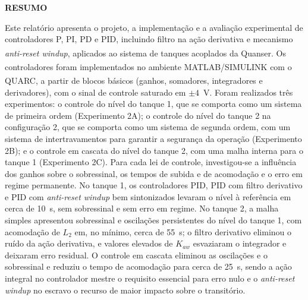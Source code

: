 \documentclass[a4paper,12pt]{article}
\begin{document}
\newpage


\thispagestyle{empty}

\begin{center}
{\large \textbf{RESUMO}}
\end{center}

\vspace{3cm}

\vspace{\baselineskip}

\begin{justify}
    \hspace{4ex}Este relatório apresenta o projeto, a implementação e a avaliação experimental de controladores P, PI, PD e PID, incluindo filtro na ação derivativa e mecanismo \textit{anti-reset windup}, aplicados ao sistema de tanques acoplados da Quanser\textsuperscript{\textregistered}. Os controladores foram implementados no ambiente MATLAB\textsuperscript{\textregistered}/SIMULINK\textsuperscript{\textregistered} com o QUARC\textsuperscript{\textregistered}, a partir de blocos básicos (ganhos, somadores, integradores e derivadores), com o sinal de controle saturado em $\pm 4$~V. Foram realizados três experimentos: o controle do nível do tanque 1, que se comporta como um sistema de primeira ordem (Experimento 2A); o controle do nível do tanque 2 na configuração 2, que se comporta como um sistema de segunda ordem, com um sistema de intertravamentos para garantir a segurança da operação (Experimento 2B); e o controle em cascata do nível do tanque 2, com uma malha interna para o tanque 1 (Experimento 2C). Para cada lei de controle, investigou-se a influência dos ganhos sobre o sobressinal, os tempos de subida e de acomodação e o erro em regime permanente. No tanque 1, os controladores PID, PID com filtro derivativo e PID com \textit{anti-reset windup} bem sintonizados levaram o nível à referência em cerca de 10~s, sem sobressinal e sem erro em regime. No tanque 2, a malha simples apresentou sobressinal e oscilações persistentes do nível do tanque 1, com acomodação de $L_2$ em, no mínimo, cerca de 55~s; o filtro derivativo eliminou o ruído da ação derivativa, e valores elevados de $K_{aw}$ esvaziaram o integrador e deixaram erro residual. O controle em cascata eliminou as oscilações e o sobressinal e reduziu o tempo de acomodação para cerca de 25~s, sendo a ação integral no controlador mestre o requisito essencial para erro nulo e o \textit{anti-reset windup} no escravo o recurso de maior impacto sobre o transitório.
\end{justify}
\end{document}
